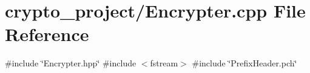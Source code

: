 \section{crypto\+\_\+project/\+Encrypter.cpp File Reference}
\label{_encrypter_8cpp}
{\ttfamily \#include \char`\"{}Encrypter.\+hpp\char`\"{}}\newline
{\ttfamily \#include $<$fstream$>$}\newline
{\ttfamily \#include \char`\"{}Prefix\+Header.\+pch\char`\"{}}\newline
